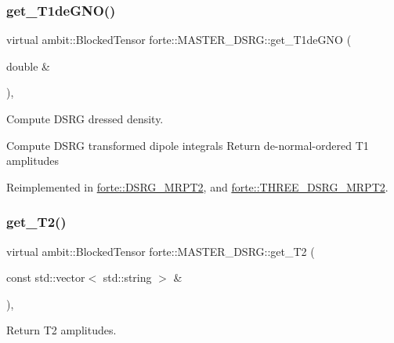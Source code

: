 \subsubsection{\texorpdfstring{get\+\_\+\+T1de\+G\+N\+O()}{get\_T1deGNO()}}
{\footnotesize\ttfamily virtual ambit\+::\+Blocked\+Tensor forte\+::\+M\+A\+S\+T\+E\+R\+\_\+\+D\+S\+R\+G\+::get\+\_\+\+T1de\+G\+NO (\begin{DoxyParamCaption}\item[{double \&}]{ }\end{DoxyParamCaption})\hspace{0.3cm}{\ttfamily [inline]}, {\ttfamily [virtual]}}



Compute D\+S\+RG dressed density. 

Compute D\+S\+RG transformed dipole integrals Return de-\/normal-\/ordered T1 amplitudes 

Reimplemented in \mbox{\hyperlink{classforte_1_1_d_s_r_g___m_r_p_t2_a3811b3a31c76af9a94621c2b13213443}{forte\+::\+D\+S\+R\+G\+\_\+\+M\+R\+P\+T2}}, and \mbox{\hyperlink{classforte_1_1_t_h_r_e_e___d_s_r_g___m_r_p_t2_a287c2ec19c2d42cce0cdc08133e43789}{forte\+::\+T\+H\+R\+E\+E\+\_\+\+D\+S\+R\+G\+\_\+\+M\+R\+P\+T2}}.

\mbox{\label{classforte_1_1_m_a_s_t_e_r___d_s_r_g_a2087fce00f429361e194be03c0eb668d}} 
\subsubsection{\texorpdfstring{get\+\_\+\+T2()}{get\_T2()}\hspace{0.1cm}{\footnotesize\ttfamily [1/2]}}
{\footnotesize\ttfamily virtual ambit\+::\+Blocked\+Tensor forte\+::\+M\+A\+S\+T\+E\+R\+\_\+\+D\+S\+R\+G\+::get\+\_\+\+T2 (\begin{DoxyParamCaption}\item[{const std\+::vector$<$ std\+::string $>$ \&}]{ }\end{DoxyParamCaption})\hspace{0.3cm}{\ttfamily [inline]}, {\ttfamily [virtual]}}



Return T2 amplitudes. 



